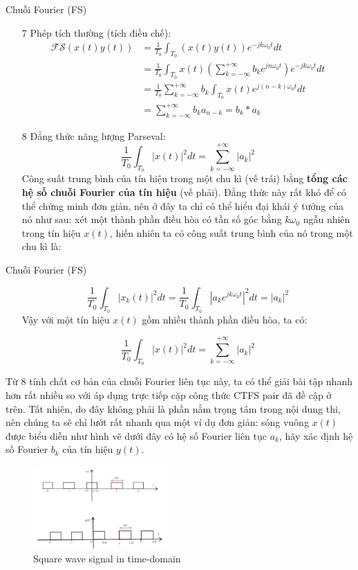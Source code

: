\documentclass[8pt]{beamer}
\begin{document}
\begin{frame}{Chuỗi Fourier (FS)}
	\begin{enumerate}
\item[7] Phép tích thường (tích điều chế):
\begin{equation*}
\begin{split}
	\mathscr{FS}(x(t)y(t))&=\frac{1}{T_{0}}\int_{T_{0}}(x(t)y(t))e^{-jk\omega_{0}t}dt\\&=\frac{1}{T_{0}}\int_{T_{0}}x(t)\left(\sum_{k=-\infty}^{+\infty}b_{k}e^{jn\omega_{0}t}\right)e^{-jk\omega_{0}t}dt\\&=\frac{1}{T_{0}}\sum_{k=-\infty}^{+\infty}b_{k}\int_{T_{0}}x(t)e^{j(n-k)\omega_{0}t}dt\\&=\sum_{k=-\infty}^{+\infty}b_{k}a_{n-k}=b_{k}*a_{k}
\end{split}
\end{equation*}
\item[8] Đẳng thức năng lượng Parseval: 
$$\frac{1}{T_{0}}\int_{T_{0}}|x(t)|^2dt=\sum_{k=-\infty}^{+\infty}|a_{k}|^2$$
Công suất trung bình của tín hiệu trong một chu kì (vế trái) bằng \textbf{tổng các hệ số chuỗi Fourier của tín hiệu} (vế phải). Đẳng thức này rất khó để có thể chứng minh đơn giản, nên ở đây ta chỉ có thể hiểu đại khái ý tưởng của nó như sau: xét một thành phần điều hòa có tần số góc bằng $k\omega_{0}$ ngẫu nhiên trong tín hiệu $x(t)$, hiến nhiên ta có công suất trung bình của nó trong một chu kì là:
	\end{enumerate}
\end{frame}
\begin{frame}{Chuỗi Fourier (FS)}
	\begin{enumerate}
		\item[]
	$$\frac{1}{T_{0}}\int_{T_{0}}|x_{k}(t)|^2dt=\frac{1}{T_{0}}\int_{T_{0}}|a_{k} e^{jk\omega_{0}t}|^2dt=|a_{k}|^2$$
	Vậy với một tín hiệu $x(t)$ gồm nhiều thành phần điều hòa, ta có:

$$\frac{1}{T_{0}}\int_{T_{0}}|x(t)|^2dt=\sum_{k=-\infty}^{+\infty}|a_{k}|^2$$
\end{enumerate}
Từ 8 tính chất cơ bản của chuỗi Fourier liên tục này, ta có thể giải bài tập nhanh hơn rất nhiều so với áp dụng trực tiếp cặp công thức CTFS pair đã đề cập ở trên. Tất nhiên, do đây không phải là phần nằm trọng tâm trong nội dung thi, nên chúng ta sẽ chỉ lướt rất nhanh qua một ví dụ đơn giản: 
sóng vuông $x(t)$ được biểu diễn như hình vẽ dưới đây có hệ số Fourier liên tục $a_{k}$, hãy xác định hệ số Fourier $b_{k}$ của tín hiệu $y(t)$.
\begin{figure}[h]
			\includegraphics[width=0.46\textwidth]{pro.jpg}
			\caption{Square wave signal in time-domain}\label{fig:re11}

		\end{figure}

\end{frame}
\end{document}
